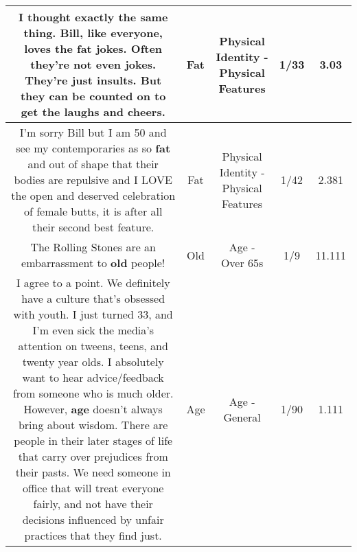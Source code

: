 \documentclass[11pt]{article}
\newlength\mylength
\begin{document}
\begin{center}
\begin{longtable}{|C{.65\mylength}|C{.30\mylength}|C{.12\mylength}|C{.12\mylength}|C{.12\mylength}|}
  \small I thought exactly the same thing. Bill, like everyone, loves the \textbf{fat} jokes. Often they're not even jokes. They're just insults. But they can be counted on to get the laughs and cheers.\normalsize   & Fat & Physical Identity - Physical Features & 1/33 & 3.03 \\  \hline
  \small I'm sorry Bill but I am 50 and see my contemporaries as so \textbf{fat} and out of shape that their bodies are repulsive and I LOVE the open and deserved celebration of female butts, it is after all their second best feature.\normalsize   & Fat & Physical Identity - Physical Features & 1/42 & 2.381 \\  \hline
  \small The Rolling Stones are an embarrassment to \textbf{old} people!\normalsize   & Old & Age - Over 65s & 1/9 & 11.111 \\  \hline
  \small I agree to a point. We definitely have a culture that's obsessed with youth. I just turned 33, and I'm even sick the media's attention on tweens, teens, and twenty year olds. I absolutely want to hear advice/feedback from someone who is much older.  However, \textbf{age} doesn't always bring about wisdom. There are people in their later stages of life that carry over prejudices from their pasts. We need someone in office that will treat everyone fairly, and not have their decisions influenced by unfair practices that they find just.\normalsize   & Age & Age - General & 1/90 & 1.111 \\  \hline

\end{longtable}
\end{center}
\end{document}
